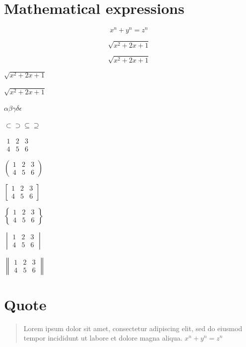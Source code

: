 \documentclass[a4paper, 12pt]{report}
\begin{document}
\section{Mathematical expressions}
\[x^n + y^n = z^n\]

\[\sqrt{x^2 + 2x +1}\]

\begin{displaymath}
\sqrt{x^2 + 2x +1}
\end{displaymath}

\(\sqrt{x^2 + 2x +1}\)

\begin{math}
\sqrt{x^2 + 2x +1}
\end{math}

\(\alpha \beta \gamma \delta \epsilon\)

\(\subset \supset \subseteq \supseteq\)

$\begin{matrix}
1 & 2 & 3 \\
4 & 5 & 6
\end{matrix}$

$\begin{pmatrix}
1 & 2 & 3 \\
4 & 5 & 6
\end{pmatrix}$

$\begin{bmatrix}
1 & 2 & 3 \\
4 & 5 & 6
\end{bmatrix}$

$\begin{Bmatrix}
1 & 2 & 3 \\
4 & 5 & 6
\end{Bmatrix}$

$\begin{vmatrix}
1 & 2 & 3 \\
4 & 5 & 6
\end{vmatrix}$

$\begin{Vmatrix}
1 & 2 & 3 \\
4 & 5 & 6
\end{Vmatrix}$


\section{Quote}
\begin{quote}
Lorem ipsum dolor sit amet, consectetur adipiscing elit, sed do eiusmod tempor incididunt ut labore et dolore magna aliqua. \(x^n + y^n = z^n\)
\end{quote}
\end{document}
